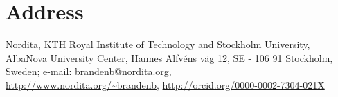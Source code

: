 \documentclass{article}
\begin{document}
\section*{Address}
% 
% 
% 
% 
%


\vspace{-2mm}\noindent
Nordita, KTH Royal Institute of Technology and Stockholm University,
AlbaNova University Center,
Hannes Alfv\'ens v\"ag 12, SE - 106 91 Stockholm, Sweden;
e-mail: {\sf brandenb@nordita.org},\\
\quad\url{http://www.nordita.org/~brandenb},
\quad\url{http://orcid.org/0000-0002-7304-021X}
\end{document}
